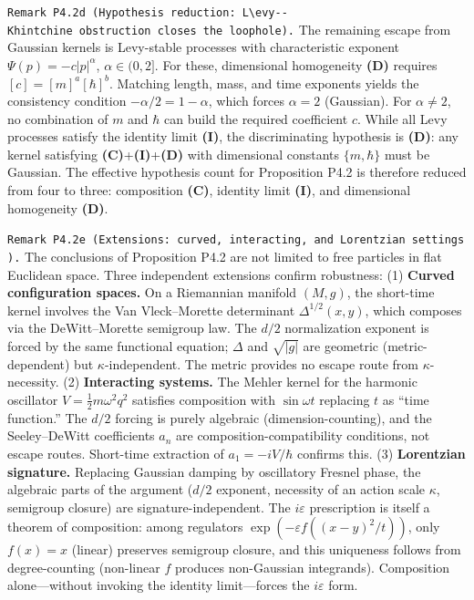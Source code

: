 \documentclass[
]{article}
\begin{document}
\texttt{Remark\ P4.2d\ (Hypothesis\ reduction:\ L\textbackslash{}\textquotesingle{}evy-\/-Khintchine\ obstruction\ closes\ the\ loophole).}
The remaining escape from Gaussian kernels is
L\textquotesingle evy-stable processes with characteristic exponent
\(\Psi(p)=-c|p|^\alpha\), \(\alpha\in(0,2]\). For these, dimensional
homogeneity \textbf{(D)} requires \([c]=[m]^a[\hbar]^b\). Matching
length, mass, and time exponents yields the consistency condition
\(-\alpha/2=1-\alpha\), which forces \(\alpha=2\) (Gaussian). For
\(\alpha\neq 2\), no combination of \(m\) and \(\hbar\) can build the
required coefficient \(c\). While all L\textquotesingle evy processes
satisfy the identity limit \textbf{(I)}, the discriminating hypothesis
is \textbf{(D)}: any kernel satisfying
\textbf{(C)}+\textbf{(I)}+\textbf{(D)} with dimensional constants
\(\{m,\hbar\}\) must be Gaussian. The effective hypothesis count for
Proposition P4.2 is therefore reduced from four to three: composition
\textbf{(C)}, identity limit \textbf{(I)}, and dimensional homogeneity
\textbf{(D)}.

\texttt{Remark\ P4.2e\ (Extensions:\ curved,\ interacting,\ and\ Lorentzian\ settings).}
The conclusions of Proposition P4.2 are not limited to free particles in
flat Euclidean space. Three independent extensions confirm robustness:
(1) \textbf{Curved configuration spaces.} On a Riemannian manifold
\((M,g)\), the short-time kernel involves the Van Vleck--Morette
determinant \(\Delta^{1/2}(x,y)\), which composes via the
DeWitt--Morette semigroup law. The \(d/2\) normalization exponent is
forced by the same functional equation; \(\Delta\) and \(\sqrt{|g|}\)
are geometric (metric-dependent) but \(\kappa\)-independent. The metric
provides no escape route from \(\kappa\)-necessity. (2)
\textbf{Interacting systems.} The Mehler kernel for the harmonic
oscillator \(V=\tfrac{1}{2}m\omega^2 q^2\) satisfies composition with
\(\sin\omega t\) replacing \(t\) as ``time function.'' The \(d/2\)
forcing is purely algebraic (dimension-counting), and the Seeley--DeWitt
coefficients \(a_n\) are composition-compatibility conditions, not
escape routes. Short-time extraction of \(a_1=-iV/\hbar\) confirms this.
(3) \textbf{Lorentzian signature.} Replacing Gaussian damping by
oscillatory Fresnel phase, the algebraic parts of the argument (\(d/2\)
exponent, necessity of an action scale \(\kappa\), semigroup closure)
are signature-independent. The \(i\varepsilon\) prescription is itself a
theorem of composition: among regulators
\(\exp(-\varepsilon f((x-y)^2/t))\), only \(f(x)=x\) (linear) preserves
semigroup closure, and this uniqueness follows from degree-counting
(non-linear \(f\) produces non-Gaussian integrands). Composition
alone---without invoking the identity limit---forces the
\(i\varepsilon\) form.
\end{document}
